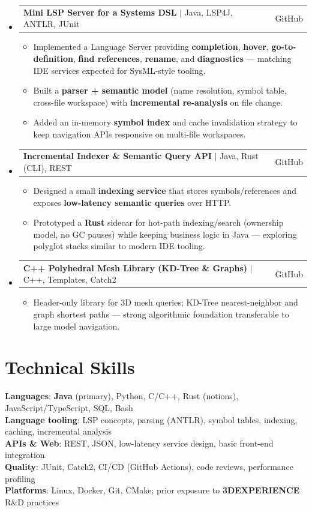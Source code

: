 \documentclass[letterpaper,11pt]{article}
\makeatletter
\newcommand{\resumeItem}[1]{\item\small{#1 \vspace{-2pt}}}
\newcommand{\resumeProjectHeading}[2]{
    \item
    \begin{tabular*}{0.97\textwidth}{l@{\extracolsep{\fill}}r}
      \small#1 & #2 \\
    \end{tabular*}\vspace{-7pt}
}
\newcommand{\resumeSubHeadingListStart}{\begin{itemize}[leftmargin=0.15in, label={}]}
\newcommand{\resumeSubHeadingListEnd}{\end{itemize}}
\newcommand{\resumeItemListStart}{\begin{itemize}[leftmargin=0.18in]}
\newcommand{\resumeItemListEnd}{\end{itemize}\vspace{-5pt}}
\makeatother
\begin{document}
\resumeSubHeadingListStart

  \resumeProjectHeading
    {\textbf{Mini LSP Server for a Systems DSL} $|$ Java, LSP4J, ANTLR, JUnit}{GitHub}
    \resumeItemListStart
      \resumeItem{Implemented a Language Server providing \textbf{completion}, \textbf{hover}, \textbf{go-to-definition}, \textbf{find references}, \textbf{rename}, and \textbf{diagnostics} --- matching IDE services expected for SysML-style tooling.}
      \resumeItem{Built a \textbf{parser + semantic model} (name resolution, symbol table, cross-file workspace) with \textbf{incremental re-analysis} on file change.}
      \resumeItem{Added an in-memory \textbf{symbol index} and cache invalidation strategy to keep navigation APIs responsive on multi-file workspaces.}
    \resumeItemListEnd

  \resumeProjectHeading
    {\textbf{Incremental Indexer \& Semantic Query API} $|$ Java, Rust (CLI), REST}{GitHub}
    \resumeItemListStart
      \resumeItem{Designed a small \textbf{indexing service} that stores symbols/references and exposes \textbf{low-latency semantic queries} over HTTP.}
      \resumeItem{Prototyped a \textbf{Rust} sidecar for hot-path indexing/search (ownership model, no GC pauses) while keeping business logic in Java --- exploring polyglot stacks similar to modern IDE tooling.}
    \resumeItemListEnd

  \resumeProjectHeading
    {\textbf{C++ Polyhedral Mesh Library (KD-Tree \& Graphs)} $|$ C++, Templates, Catch2}{GitHub}
    \resumeItemListStart
      \resumeItem{Header-only library for 3D mesh queries; KD-Tree nearest-neighbor and graph shortest paths --- strong algorithmic foundation transferable to large model navigation.}
    \resumeItemListEnd

\resumeSubHeadingListEnd

\section{Technical Skills}

\begin{itemize}[leftmargin=0.15in, label={}]
  \small{\item{
    \textbf{Languages}: \textbf{Java} (primary), Python, C/C++, Rust (notions), JavaScript/TypeScript, SQL, Bash \\
    \textbf{Language tooling}: LSP concepts, parsing (ANTLR), symbol tables, indexing, caching, incremental analysis \\
    \textbf{APIs \& Web}: REST, JSON, low-latency service design, basic front-end integration \\
    \textbf{Quality}: JUnit, Catch2, CI/CD (GitHub Actions), code reviews, performance profiling \\
    \textbf{Platforms}: Linux, Docker, Git, CMake; prior exposure to \textbf{3DEXPERIENCE} R\&D practices
  }}
\end{itemize}
\end{document}
